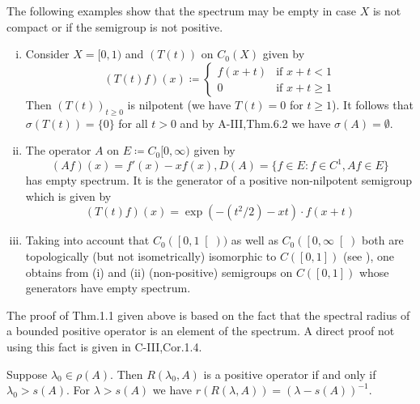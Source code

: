 The following examples show that the spectrum may be empty in case $X$ is not compact or if the semigroup is not positive.
\begin{examples}\label{ex:b3-1.2}

\begin{enumerate}[(i), wide]	
\item  
Consider $X = [0,1)$ and $(T(t))$ on $C_{0}(X)$ given by
\begin{equation}\label{eq:b3-1.7}
	(T(t)f)(x) \coloneqq \begin{cases} 
		f(x+t) & \text{if } x+t < 1 \\
		0 & \text{if } x+t \geq 1
	\end{cases}
\end{equation}
Then $(T(t))_{t\geq 0}$ is nilpotent (we have $T(t) = 0$ for $t \geq 1$).
It follows that $\sigma(T(t)) = \{0\}$ for all $t > 0$ and by A-III,Thm.6.2 we have $\sigma(A) = \emptyset$.

\item 
The operator $A$ on $E \coloneqq C_{0}[0,\infty)$ given by
\begin{equation}\label{eq:b3-1.8}
	(Af)(x) = f'(x) - xf(x), D(A) = \{f \in E : f \in C^1, Af \in E\}
\end{equation}
has empty spectrum.
It is the generator of a positive non-nilpotent semigroup which is given by
\begin{equation}\label{eq:b3-1.9}
	(T(t)f)(x) = \exp(-(t^2/2) - xt) \cdot f(x+t)
\end{equation}
	
\item 
Taking into account that $C_{0}(\left[0,1\right[))$ as well as 
$C_{0}(\left[0,\infty\right[)$ both are topologically (but not isometrically) isomorphic to $C(\left[0,1\right])$ (see \citet[Sec.21.5]{semadeni:1971}), one obtains from (i) and (ii) (non-positive) semigroups on $C(\left[0,1\right])$ whose generators have empty spectrum.
\end{enumerate}
\end{examples}
The proof of Thm.1.1 given above is based on the fact that the spectral radius of a bounded positive operator is an element of the spectrum.
A direct proof not using this fact is given in C-III,Cor.1.4.
\begin{corollary}\label{cor:b3-1.3}
	Suppose $\lambda_0 \in \rho(A)$.
	Then $R(\lambda_0,A)$ is a positive operator if and only if $\lambda_0 > s(A)$.
	For $\lambda > s(A)$ we have $r(R(\lambda,A)) = (\lambda - s(A))^{-1}$.
\end{corollary}

